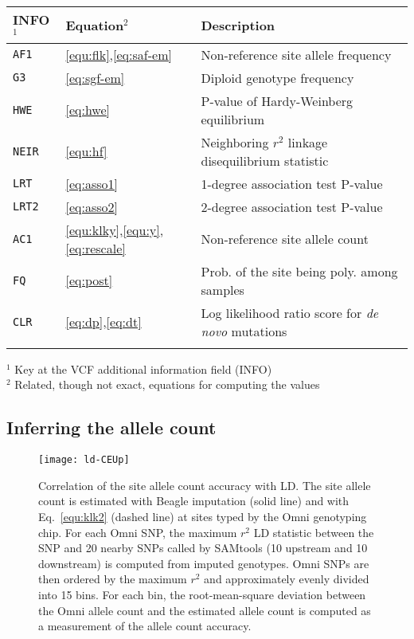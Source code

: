 \documentclass{bioinfo}
\begin{document}
\begin{table}[!htb]\label{tab:notation}
{\begin{tabular}{llp{5.6cm}}
\toprule
INFO$^1$ & Equation$^2$ & Description \\
\midrule
{\tt AF1} & \ref{equ:flk},\ref{eq:saf-em} & Non-reference site allele frequency \\
{\tt G3} & \ref{eq:sgf-em} & Diploid genotype frequency \\
{\tt HWE} & \ref{eq:hwe} & P-value of Hardy-Weinberg equilibrium \\
{\tt NEIR} & \ref{equ:hf} & Neighboring $r^2$ linkage disequilibrium statistic \\
{\tt LRT} & \ref{eq:asso1} & 1-degree association test P-value \\
{\tt LRT2} & \ref{eq:asso2} & 2-degree association test P-value \\
{\tt AC1} & \ref{equ:klky},\ref{equ:y},\ref{eq:rescale} & Non-reference site allele count \\
{\tt FQ} & \ref{eq:post} & Prob. of the site being poly. among samples \\
{\tt CLR} & \ref{eq:dp},\ref{eq:dt} & Log likelihood ratio score for {\it de novo} mutations \\
\botrule
\end{tabular}}{
$^1$ Key at the VCF additional information field (INFO)\\
$^2$ Related, though not exact, equations for computing the values
}
\end{table}

\subsection{Inferring the allele count}

\begin{figure}[!htb]
\centering
\texttt{[image: ld-CEUp]}
\caption{Correlation of the site allele count accuracy with LD. The site allele
count is estimated with Beagle imputation (solid line) and with
Eq.~\eqref{equ:klk2} (dashed line) at sites typed by the Omni genotyping chip.
For each Omni SNP, the maximum $r^2$ LD statistic between the SNP and
20 nearby SNPs called by SAMtools (10 upstream and 10 downstream) is computed from imputed genotypes.
Omni SNPs are then ordered by the maximum $r^2$ and approximately evenly
divided into 15 bins.  For each bin, the root-mean-square deviation between the
Omni allele count and the estimated allele count is computed as a measurement
of the allele count accuracy.}\label{fig:ac}
\end{figure}
\end{document}
